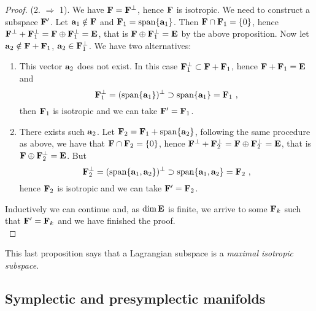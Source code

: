 \documentclass[12pt]{report}
\def\qed{\ifvmode\removelastskip\fi
{\unskip\nobreak\hfil\penalty50\hbox{}\nobreak\hfil
\hbox{\vrule height1.2ex width1.2ex}\parfillskip=0pt
\finalhyphendemerits=0 \par\smallskip}}
\begin{document}
\begin{proof}
(2. $\Longrightarrow$  1).
We have ${\bf F}={\bf F}^\bot$, hence ${\bf F}$ is isotropic. We need to construct a subspace ${\bf F}'$.
Let ${\bf a}_{1}\notin{\bf F}$ and ${\bf F}_{1}=\mathrm{span}\{{\bf a}_{1}\}$. Then 
${\bf F}\cap{\bf F}_{1}=\{0\}$, hence 
${\bf F}^\bot+{\bf F}_{1}^\bot={\bf F}\oplus{\bf F}_{1}^\bot={\bf E}$, that is ${\bf F}\oplus{\bf F}_{1}^\bot={\bf E}$ by the above proposition.
Now let ${\bf a}_{2}\notin{\bf F}+{\bf F}_{1}$, ${\bf a}_{2}\in{\bf F}_{1}^\bot$. We have two alternatives:
\begin{enumerate}
\item This vector ${\bf a}_{2}$ does not exist. In this case ${\bf F}_{1}^\bot\subset{\bf F}+{\bf F}_{1}$, hence ${\bf F}+{\bf F}_{1}={\bf E}$ and
$$
{\bf F}_{1}^\bot=(\mathrm{span}\{{\bf a}_{1}\})^\bot\supset\mathrm{span}\{{\bf a}_{1}\}={\bf F}_{1}\ ,
$$
then ${\bf F}_{1}$ is isotropic and we can take ${\bf F}'={\bf F}_{1}$.
\item  
There exists such ${\bf a}_{2}$. Let 
 ${\bf F}_{2}={\bf F}_{1}+\mathrm{span}\{{\bf a}_{2}\}$, following the same procedure as above, we have that 
${\bf F}\cap{\bf F}_{2}=\{0\}$, hence 
${\bf F}^\bot+{\bf F}_{2}^\bot={\bf F}\oplus{\bf F}_{2}^\bot={\bf E}$, that is ${\bf F}\oplus{\bf F}_{2}^\bot={\bf E}$. But
$$
{\bf F}_{2}^\bot=(\mathrm{span}\{{\bf a}_{1},{\bf a}_{2}\})^\bot
\supset\mathrm{span}\{{\bf a}_{1},{\bf a}_{2}\}={\bf F}_{2} \ ,
$$
hence ${\bf F}_{2}$ is isotropic and we can take ${\bf F}'={\bf F}_{2}$.
\end{enumerate}
Inductively we can continue and, as $\dim{\bf E}$ is finite, we arrive to some ${\bf F}_{k}$ such that ${\bf F}'={\bf F}_{k}$ and we have finished the proof.
\\ \qed  \end{proof}

This last proposition says that a Lagrangian subspace is a \textsl{maximal isotropic subspace}. 




\subsection{Symplectic and presymplectic manifolds}
\protect\label{vs}
\end{document}
